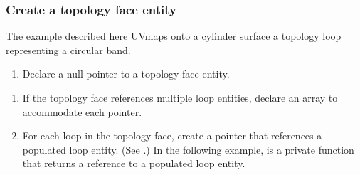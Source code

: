 \documentclass[letterpaper,12pt,english,openany,oneside]{sphinxmanual}
\begin{document}
\begin{sphinxVerbatim}[commandchars=\\\{\}]
    
\end{sphinxVerbatim}


\subsubsection{Create a topology face entity}
\label{\detokenize{Plugins_A3D_API:create-a-topology-face-entity}}
The example described here UV\sphinxhyphen{}maps onto a cylinder surface a topology loop representing a circular band.
\begin{enumerate}
%
\item {} 
Declare a null pointer to a topology face entity.

\end{enumerate}

\begin{sphinxVerbatim}[commandchars=\\\{\}]
   
\end{sphinxVerbatim}
\begin{enumerate}
%
\setcounter{enumi}{1}
\item {} 
If the topology face references multiple loop entities, declare an array to accommodate each pointer.

\item {} 
For each loop in the topology face, create a pointer that references a populated loop entity. (See .) In the following example,  is a private function that returns a reference to a populated loop entity.

\end{enumerate}
\end{document}
